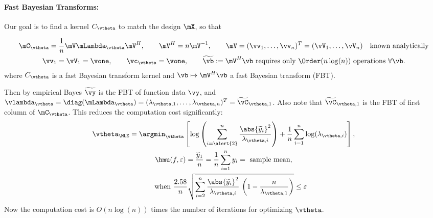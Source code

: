 

\paragraph{Fast Bayesian Transforms:}
Our goal is to find a kernel $C_\vtheta$ to match the design $\mX$, so that

\begin{gather*}
\mC_\vtheta = \frac 1n \mV \mLambda_\vtheta \mV^H , 
\quad \quad \mV^H = n \mV^{-1}, \qquad
\mV = (\vv_1,\ldots,\vv_n)^T = (\vV_1,\ldots,\vV_n) \quad \text{known analytically} \\
\vv_1 = \vV_1 = \vone, \qquad \vc_\vtheta = \vone, \qquad
	\widetilde{\vb} := \mV^H \vb  \text{ requires only $\Order(n \log(n))$ operations } \forall \vb.
\end{gather*}
where $C_\vtheta$ is a fast Bayesian transform kernel and $\vb \mapsto \mV^H \vb$ a \alert{fast Bayesian transform (FBT)}. 

Then by empirical Bayes $\widetilde{\vy}$ is the FBT of function data $\vy$, and $\vlambda_\vtheta = \diag(\mLambda_\vtheta) = (\lambda_{\vtheta,1} , \ldots, \lambda_{\vtheta,n})^T=  \widetilde{\vC}_{\vtheta,1}$. Also note that $\widetilde{\vC}_{\vtheta,1}$ is the FBT of first column of  $\mC_\vtheta$. This reduces the computation cost significantly:
\begin{gather*}
\vtheta_{\MLE} = 
\argmin_{\vtheta}
\left[
\log\left(
\sum_{i=\alert{2}}^n \frac{\abs{\widetilde{y}_i}^2}{\lambda_{\vtheta, i}}
\right) 
+ \frac{1}{n}\sum_{i=1}^n \log(\lambda_{\vtheta,i})
\right], \\
\hmu(f,\varepsilon) =  \frac{\widetilde{y}_1}{n} = \frac 1n \sum_{i=1}^n y_i = \text{ sample mean}, \\
\qquad \text{when }
\frac{2.58}{n}\sqrt{
	\sum_{i=2}^{n} \frac{\abs{\widetilde{y}_i}^2}{\lambda_{\vtheta,i}}  
	\,
	\left( 1 -  \frac{n}{\lambda_{\vtheta,1}} \right) 
} \le \varepsilon
\end{gather*}
Now the computation cost is \alert{$O(n \log (n))$} times the number of iterations for optimizing $\vtheta$.








